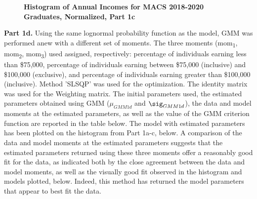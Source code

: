\documentclass[letterpaper,12pt]{article}
\theoremstyle{definition}
\begin{document}
\begin{figure}[htb]\centering\captionsetup{width=4.0in}
  \caption{\textbf{Histogram of Annual Incomes for MACS 2018-2020 Graduates, Normalized, Part 1c}}\label{FigPS3_1c}
\end{figure}

\noindent\newline\textbf{Part 1d.} Using the same lognormal probability function as the model, GMM was performed anew with a different set of moments. The three moments (mom\textsubscript{1}, mom\textsubscript{2}, mom\textsubscript{3}) used assigned, respectively: percentage of individuals earning less than \$75,000, percentage of individuals earning between \$75,000 (inclusive) and \$100,000 (exclusive), and percentage of individuals earning greater than \$100,000 (inclusive). Method 'SLSQP' was used for the optimization. The identity matrix was used for the Weighting matrix. The initial parameters used, the estimated parameters obtained using GMM ($\mu_{GMM1d}$ and $\sig_{GMM1d}$), the data and model moments at the estimated parameters, as well as the value of the GMM criterion function are reported in the table below. The model with estimated parameters has been plotted on the histogram from Part 1a-c, below. A comparison of the data and model moments at the estimated parameters suggests that the estimated parameters returned using these three moments offer a reasonably good fit for the data, as indicated both by the close agreement between the data and model moments, as well as the visually good fit observed in the histogram and models plotted, below. Indeed, this method has returned the model parameters that appear to best fit the data.
\end{document}

